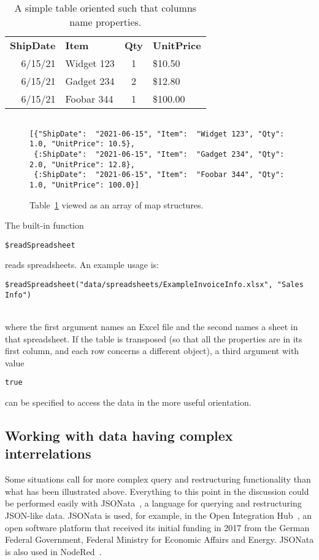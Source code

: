 \documentclass[9pt,letterpaper]{article}
\newcommand{\stt}[1]{\begin{footnotesize}\texttt{#1}\end{footnotesize}}
\begin{document}
\begin{table}[H]
  \caption{A simple table oriented such that columns name properties.}
\label{table:simple}
\begin{tabular}{r | l | c | l}

\textbf{ShipDate}& \textbf{Item}& \textbf{Qty}& \textbf{UnitPrice} \\ \hhline{=|=|=|=}
        6/15/21	      & Widget 123   &	1	   &  \$10.50 \\
        6/15/21	      & Gadget 234   &	2	   &  \$12.80 \\
        6/15/21	      & Foobar 344   &	1	   &  \$100.00
\end{tabular}
\end{table}

\begin{figure}[H]
    \caption{Table~\ref{table:simple} viewed as an array of map structures.}
    \label{code:simple}
\begin{lstlisting}

[{"ShipDate":  "2021-06-15", "Item":  "Widget 123", "Qty": 1.0, "UnitPrice": 10.5},
 {:ShipDate":  "2021-06-15", "Item":  "Gadget 234", "Qty": 2.0, "UnitPrice": 12.8},
 {:ShipDate":  "2021-06-15", "Item":  "Foobar 344", "Qty": 1.0, "UnitPrice": 100.0}]
\end{lstlisting}
\end{figure}

The built-in function \stt{\$readSpreadsheet} reads spreadsheets.
An example usage is:\\
\vspace{3mm}
\stt{\$readSpreadsheet("data/spreadsheets/ExampleInvoiceInfo.xlsx", "Sales Info")} \\
\vspace{3mm}
where the first argument names an Excel file and the second names a sheet in that spreadsheet.
If the table is transposed (so that all the properties are in its first column, and each row concerns a different object), a third argument with value \stt{true} can be specified to access the data in the more useful orientation.

\subsection{Working with data having complex interrelations}

Some situations call for more complex query and restructuring functionality than what has been illustrated above.
Everything to this point in the discussion could be performed easily with JSONata~\cite{Jsonata.org2021}, a language for querying and restructuring JSON-like data.
JSONata is used, for example, in the Open Integration Hub~\cite{OIH2021}, an open software platform that received its initial funding in 2017 from the German Federal Government,
Federal Ministry for Economic Affairs and Energy. %
JSONata is also used in NodeRed~\cite{Node-Red2021}.
\end{document}
